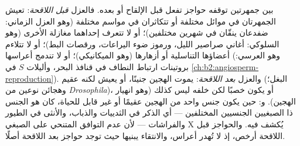 \begin{proposition}\label{prop:b2:speciation:isolation}
 بين جمهرتين توقفه حواجز تفعل
قبل الإلقاح أو بعده. فالعزل \emph{قبل اللاقحة}: تعيش الجمهرتان
في موائل مختلفة أو تتكاثران في مواسم مختلفة (وهو العزل
الزماني: ضفدعان ينقّان في شهرين مختلفين)؛ أو لا
تتعرف إحداهما مغازلة الأخرى (وهو السلوكي: أغاني
صراصير الليل، ورموز ضوء اليراعات، ورقصات البط)؛ أو لا تتلاءم
أعضاؤها التناسلية أو أزهارها (وهو الميكانيكي)؛ أو لا تندمج أعراسها
(وهو العرسي: بروتينات ارتباط النطاف في قنافذ البحر، وأليلات
$S$ في \cref{ch:b2:angiosperm-reproduction}).
والعزل \emph{بعد اللاقحة}: يموت الهجين جنينًا، أو يعيش لكنه
عقيم (البغل؛ وهجائن نوعين من \emph{Drosophila})، أو
يكون خصبًا لكن خلفه ليس كذلك (وهو انهيار الهجين).
و\emph{}: حين يكون جنس واحد من الهجين عقيمًا أو
غير قابل للحياة، كان هو الجنس ذا الصبغيين الجنسيين المختلفين ---
أي الذكر في الثدييات والذباب، والأنثى في الطيور والفراشات ---
لأن عدم التوافق المتنحي على الصبغي X يُكشف فيه.
والحواجز قبل اللاقحة أرخص، إذ لا تُهدر أعراس،
والانتقاء يبنيها حيث توجد حواجز بعد اللاقحة أصلًا.
\end{proposition}

